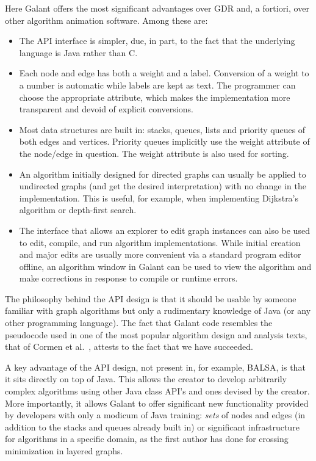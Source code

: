 Here Galant offers the most significant advantages over GDR and, a fortiori,
over other algorithm animation software. Among these are:

\begin{itemize}

\item
  The API interface is simpler, due, in part, to the fact that the
  underlying language is Java rather than C.

\item
  Each node and edge has both a weight and a label. Conversion of a weight to
  a number is automatic while labels are kept as text. The programmer can
  choose the appropriate attribute, which makes the implementation more
  transparent and devoid of explicit conversions.

\item
  Most data structures are built in: stacks, queues, lists and priority
  queues of both edges and vertices. Priority queues implicitly use the
  weight attribute of the node/edge in question. The weight attribute is also
  used for sorting.

\item
  An algorithm initially designed for directed graphs can usually be applied
  to undirected graphs (and get the desired interpretation) with no change in
  the implementation.
  This is useful, for example, when implementing Dijkstra's
  algorithm or depth-first search.

\item
  The interface that allows an explorer to edit graph instances can also be used
  to edit, compile, and run algorithm implementations. While initial creation
  and major edits are usually more convenient via a standard program editor
  offline, an algorithm window in Galant can be used to view the algorithm and
  make corrections in response to compile or runtime errors.

\end{itemize}

The philosophy behind the API design is that it should be usable by someone
familiar with graph algorithms but only a rudimentary knowledge of Java (or
any other programming language).
The fact that Galant code resembles the pseudocode used
in one of the most
popular algorithm design and analysis texts, that of Cormen et al.~\cite{2009-Intro_to_Algorithms-Cormen},
attests to the fact that we have succeeded.

A key advantage of the API design, not present in, for example, BALSA, is that it sits directly on top of Java.
This allows the creator to develop arbitrarily complex algorithms using other Java class API's and ones devised by the creator.
More importantly, it allows Galant to offer significant new functionality
provided by developers with only a modicum of Java training:
\emph{sets} of nodes and edges (in addition to the stacks and queues already
built in) or significant infrastructure for algorithms in a specific domain,
as the first author has done for crossing minimization in layered graphs.

